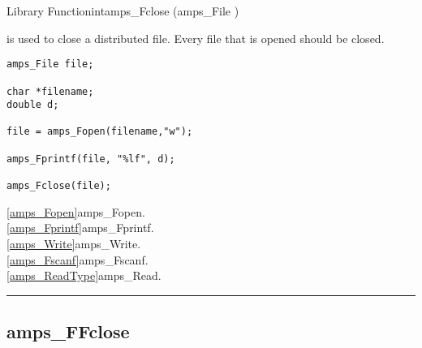 \begin{deftypefn}{Library Function}{int}{amps\_Fclose}
(amps_File )

\DESCRIPTION

 is used to close a distributed file.  Every file
that is opened should be closed.

\EXAMPLE
\begin{display}\begin{verbatim}
amps_File file;

char *filename;
double d;

file = amps_Fopen(filename,"w");

amps_Fprintf(file, "%lf", d);

amps_Fclose(file);
\end{verbatim}\end{display}

\SEEALSO
\vref{amps_Fopen}{amps\_Fopen}. \\
\vref{amps_Fprintf}{amps\_Fprintf}. \\
\vref{amps_Write}{amps\_Write}. \\
\vref{amps_Fscanf}{amps\_Fscanf}. \\
\vref{amps_ReadType}{amps\_Read}. \\

\end{deftypefn}


\noindent\rule{\textwidth}{1mm}

\subsection{amps\_FFclose}
\label{amps_FFclose}



